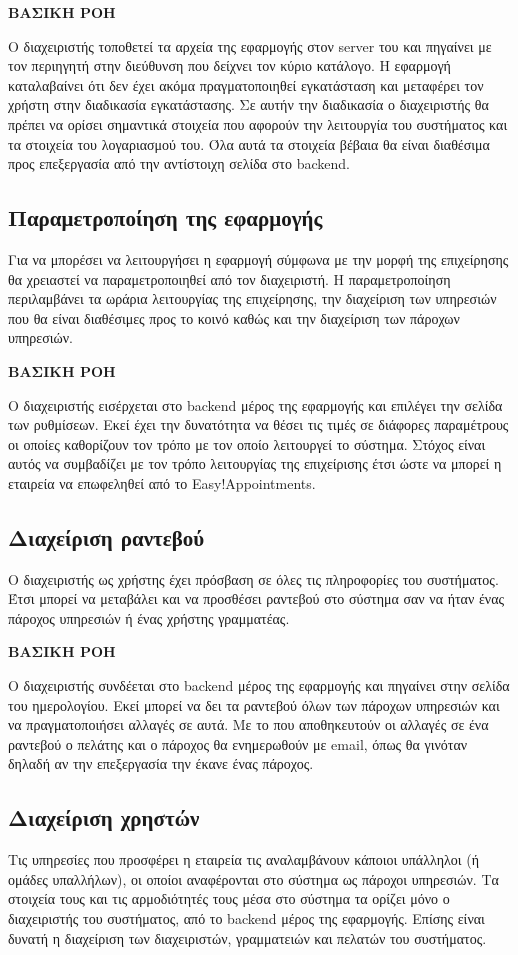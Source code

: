\textbf{ΒΑΣΙΚΗ ΡΟΗ} 

Ο διαχειριστής τοποθετεί τα αρχεία της εφαρμογής στον server του και πηγαίνει με τον περιηγητή στην διεύθυνση που δείχνει τον κύριο κατάλογο. Η εφαρμογή καταλαβαίνει ότι δεν έχει ακόμα πραγματοποιηθεί εγκατάσταση και μεταφέρει τον χρήστη στην διαδικασία εγκατάστασης. Σε αυτήν την διαδικασία ο διαχειριστής θα πρέπει να ορίσει σημαντικά στοιχεία που αφορούν την λειτουργία του συστήματος και τα στοιχεία του λογαριασμού του. Όλα αυτά τα στοιχεία βέβαια θα είναι διαθέσιμα προς επεξεργασία από την αντίστοιχη σελίδα στο backend.

\subsection{Παραμετροποίηση της εφαρμογής}
Για να μπορέσει να λειτουργήσει η εφαρμογή σύμφωνα με την μορφή της επιχείρησης θα χρειαστεί να παραμετροποιηθεί από τον διαχειριστή. Η παραμετροποίηση περιλαμβάνει τα ωράρια λειτουργίας της επιχείρησης, την διαχείριση των υπηρεσιών που θα είναι διαθέσιμες προς το κοινό καθώς και την διαχείριση των πάροχων υπηρεσιών.

\textbf{ΒΑΣΙΚΗ ΡΟΗ}

Ο διαχειριστής εισέρχεται στο backend μέρος της εφαρμογής και επιλέγει την σελίδα των ρυθμίσεων. Εκεί έχει την δυνατότητα να θέσει τις τιμές σε διάφορες παραμέτρους οι οποίες καθορίζουν τον τρόπο με τον οποίο λειτουργεί το σύστημα. Στόχος είναι αυτός να συμβαδίζει με τον τρόπο λειτουργίας της επιχείρισης έτσι ώστε να μπορεί η εταιρεία να επωφεληθεί από το Easy!Appointments.

\subsection{Διαχείριση ραντεβού}
Ο διαχειριστής ως χρήστης έχει πρόσβαση σε όλες τις πληροφορίες του συστήματος. Έτσι μπορεί να μεταβάλει και να προσθέσει ραντεβού στο σύστημα σαν να ήταν ένας πάροχος υπηρεσιών ή ένας χρήστης γραμματέας.

\textbf {ΒΑΣΙΚΗ ΡΟΗ}

Ο διαχειριστής συνδέεται στο backend μέρος της εφαρμογής και πηγαίνει στην σελίδα του ημερολογίου. Εκεί μπορεί να δει τα ραντεβού όλων των πάροχων υπηρεσιών και να πραγματοποιήσει αλλαγές σε αυτά. Με το που αποθηκευτούν οι αλλαγές σε ένα ραντεβού ο πελάτης και ο πάροχος θα ενημερωθούν με email, όπως θα γινόταν δηλαδή αν την επεξεργασία την έκανε ένας πάροχος.

\subsection {Διαχείριση χρηστών}
Τις υπηρεσίες που προσφέρει η εταιρεία τις αναλαμβάνουν κάποιοι υπάλληλοι (ή ομάδες υπαλλήλων), οι οποίοι αναφέρονται στο σύστημα ως πάροχοι υπηρεσιών. Τα στοιχεία τους και τις αρμοδιότητές τους μέσα στο σύστημα τα ορίζει μόνο ο διαχειριστής του συστήματος, από το backend μέρος της εφαρμογής. Επίσης είναι δυνατή η διαχείριση των διαχειριστών, γραμματειών και πελατών του συστήματος.

